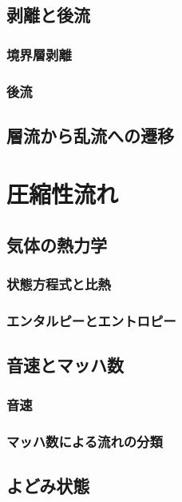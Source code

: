 \documentclass[uplatex,dvipdfmx,a4j,11pt]{jsreport}
\numberwithin{equation}{chapter}
\begin{document}
\section{剥離と後流}

\subsection{境界層剥離}

\subsection{後流}

\section{層流から乱流への遷移}



\chapter{圧縮性流れ}

\section{気体の熱力学}

\subsection{状態方程式と比熱}

\subsection{エンタルピーとエントロピー}

\section{音速とマッハ数}

\subsection{音速}

\subsection{マッハ数による流れの分類}

\section{よどみ状態}
\end{document}
